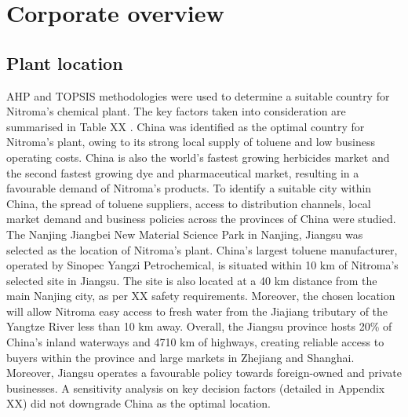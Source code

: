 \section{Corporate overview}
\subsection{Plant location}
AHP and TOPSIS methodologies were used to determine a suitable country for Nitroma’s chemical plant. The key factors taken into consideration are summarised in Table XX . China was identified as the optimal country for Nitroma's plant, owing to its strong local supply of toluene and low business operating costs. China is also the world’s fastest growing herbicides market and the second fastest growing dye and pharmaceutical market, resulting in a favourable demand of Nitroma’s products. To identify a suitable city within China, the spread of toluene suppliers, access to distribution channels, local market demand and business policies across the provinces of China were studied. The Nanjing Jiangbei New Material Science Park in Nanjing, Jiangsu was selected as the location of Nitroma’s plant. China’s largest toluene manufacturer, operated by Sinopec Yangzi Petrochemical, is situated within 10 km of Nitroma’s selected site in Jiangsu. The site is also located at a 40 km distance from the main Nanjing city, as per XX safety requirements. Moreover, the chosen location will allow Nitroma easy access to fresh water from the Jiajiang tributary of the Yangtze River less than 10 km away. Overall, the Jiangsu province hosts 20\% of China’s inland waterways and 4710 km of highways, creating reliable access to buyers within the province and large markets in Zhejiang and Shanghai. Moreover, Jiangsu operates a favourable policy towards foreign-owned and private businesses. A sensitivity analysis on key decision factors (detailed in Appendix XX) did not downgrade China as the optimal location.

